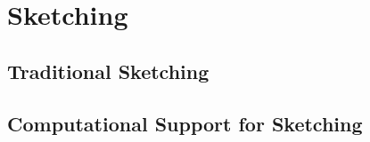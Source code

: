 


\section{Sketching}


\subsection{Traditional Sketching}


\subsection{Computational Support for Sketching}




